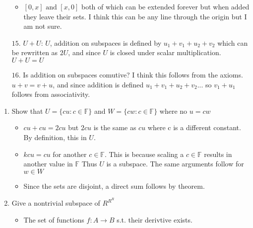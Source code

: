 \documentclass[a4paper]{article}
\begin{document}
\begin{enumerate}
        \begin{itemize}
            \item $[0,x] \text{ and } [x,0]$ both of which can be extended forever but when added they leave their sets. I think this can be any line through the origin but I am not sure. 
        \end{itemize}
        \item[$15.$] $U + U$:  $U$, addition on subspaces is defined by $u_1 + v_1 + u_2 + v_2$ which can be rewritten as $2U$, and since $U$ is closed under scalar multiplication. $U + U = U$    
        \item[$16.$] Is addition on subspaces comutive? I think this follows from the axioms. $u + v = v + u$, and since addition is defined $u_1 + v_1 + u_2 + v_2...$ so $v_1 + u_1$ follows from associativity. \\

\end{enumerate}
\begin{enumerate}
    \item Show that $U = \{cu: c \in \mathbb{F}\}$ and $W = \{cw: c \in  \mathbb{F}\} $ where no $u = cw$
        \begin{itemize}
            \item $cu + cu = 2cu$ but $2cu$ is the same as $cu$ where c is a different constant. By definition, this in $U$.   
            \item  $kcu = cu$ for another $c \in \mathbb{F}$. This is because scaling a $c \in  \mathbb{F}$ results in another value in $\mathbb{F}$ Thus $U$ is a subspace. The same arguments follow for $w \in W$
            \item Since the sets are disjoint, a direct sum follows by theorem.

        \end{itemize}
    \item Give a nontrivial subspace of $R^{R^{R}}$ 
        \begin{itemize}
            \item The set of functions $f: A\to B$ s.t. their derivtive exists. 
        \end{itemize}
\end{enumerate}
\end{document}
